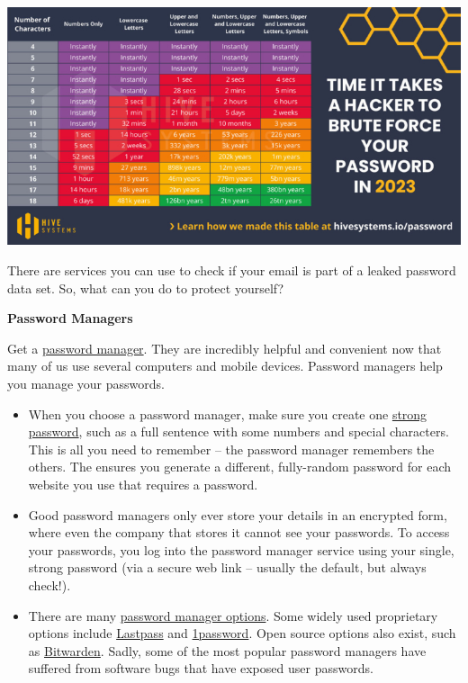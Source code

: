 \documentclass[
]{book}
\providecommand{\tightlist}{%
  \setlength{\itemsep}{0pt}\setlength{\parskip}{0pt}}
\theoremstyle{definition}
\theoremstyle{definition}
\theoremstyle{definition}
\theoremstyle{definition}
\theoremstyle{remark}
\begin{document}
\includegraphics{assets/u1/brute.jpg}

There are services you can use to check if your email is part of a leaked password data set. So, what can you do to protect yourself?

\textbf{Password Managers}

Get a \href{https://en.wikipedia.org/wiki/Password_manager}{password manager}. They are incredibly helpful and convenient now that many of us use several computers and mobile devices. Password managers help you manage your passwords.

\begin{itemize}
\tightlist
\item
  When you choose a password manager, make sure you create one \href{https://www.howtogeek.com/195430/how-to-create-a-strong-password-and-remember-it/}{strong password}, such as a full sentence with some numbers and special characters. This is all you need to remember -- the password manager remembers the others. The ensures you generate a different, fully-random password for each website you use that requires a password.\\
\item
  Good password managers only ever store your details in an encrypted form, where even the company that stores it cannot see your passwords. To access your passwords, you log into the password manager service using your single, strong password (via a secure web link -- usually the default, but always check!).\\
\item
  There are many \href{https://www.google.co.nz/search?q=password+managers\&bshm=rimc/1}{password manager options}. Some widely used proprietary options include \href{https://www.lastpass.com/}{Lastpass} and \href{https://1password.com/}{1password}. Open source options also exist, such as \href{https://bitwarden.com/}{Bitwarden}. Sadly, some of the most popular password managers have suffered from software bugs that have exposed user passwords.
\end{itemize}
\end{document}

